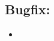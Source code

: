 \documentclass[
40pt,				%
openright,			%
oneside,			%
a4paper,			%
chapter=TITLE,		%
sumario=tradicional,
english,			%
]{abntex2}
\begin{document}
	\subsection*{\textbf{Bugfix:}}
	\begin{itemize} \setlength\itemsep{0em}

		\item 
	\end{itemize}



	
	
	\postextual
	
	
\end{document}
